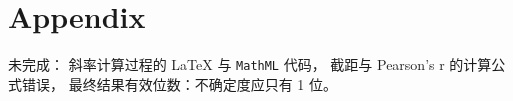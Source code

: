 \appendix
\onecolumn
\section{Appendix}

\begin{center}
\end{center}

未完成：
斜率计算过程的 \LaTeX{} 与 \verb|MathML| 代码，
截距与 Pearson's r 的计算公式错误，
最终结果有效位数：不确定度应只有 1 位。